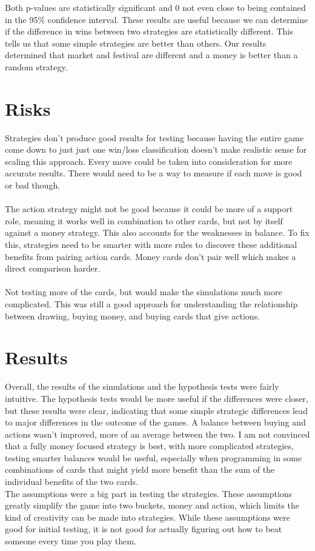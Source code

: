 \documentclass[11pt, oneside]{article}   	%
\begin{document}
Both p-values are statistically significant and 0 not even close to being contained in the 95\% confidence interval. These results are useful because we can determine if the difference in wins between two strategies are statistically different. This tells us that some simple strategies are better than others. Our results determined that market and festival are different and a money is better than a random strategy. 

\section{Risks}

Strategies don't produce good results for testing because having the entire game come down to just just one win/loss classification doesn't make realistic sense for scaling this approach. Every move could be taken into consideration for more accurate results. There would need to be a way to measure if each move is good or bad though. 
\\
\\
The action strategy might not be good because it could be more of a support role, meaning it works well in combination to other cards, but not by itself against a money strategy. This also accounts for the weaknesses in balance. To fix this, strategies need to be smarter with more rules to discover these additional benefits from pairing action cards. Money cards don't pair well which makes a direct comparison harder. 
\\
\\
Not testing more of the cards, but would make the simulations much more complicated. This was still a good approach for understanding the relationship between drawing, buying money, and buying cards that give actions.

\section{Results}

Overall, the results of the simulations and the hypothesis tests were fairly intuitive. The hypothesis tests would be more useful if the differences were closer, but these results were clear, indicating that some simple strategic differences lead to major differences in the outcome of the games. A balance between buying and actions wasn't improved, more of an average between the two. I am not convinced that a fully money focused strategy is best, with more complicated strategies, testing smarter balances would be useful, especially when programming in some combinations of cards that might yield more benefit than the sum of the individual benefits of the two cards. 
\\
The assumptions were a big part in testing the strategies. These assumptions greatly simplify the game into two buckets, money and action, which limits the kind of creativity can be made into strategies. While these assumptions were good for initial testing, it is not good for actually figuring out how to beat someone every time you play them. 
\\
\end{document}

